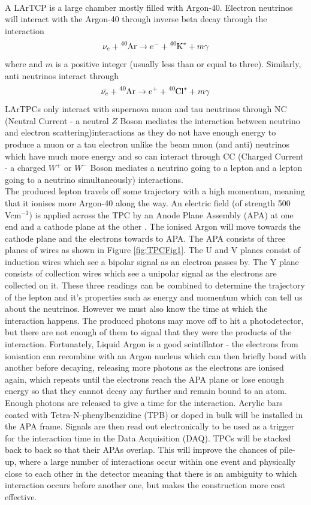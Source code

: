 \documentclass[a4paper,12,oneside,notitlepage]{report}
\begin{document}
\vspace{0.5cm}
\\A LArTCP is a large chamber mostly filled with Argon-40. Electron neutrinos will interact with the Argon-40 through inverse beta decay through the interaction
$$\nu_e + \ce{^{40}Ar} \rightarrow e^- +\ce{^{40}K^*} +m\gamma$$
where and $m$ is a positive integer (usually less than or equal to three). Similarly, anti neutrinos interact through
$$\bar{\nu_e}+\ce{^{40}Ar} \rightarrow e^+ + \ce{^{40}Cl^*}+m \gamma$$
LArTPCs only interact with supernova muon and tau neutrinos through NC (Neutral Current - a neutral $Z$ Boson mediates the interaction between neutrino and electron scattering)interactions as they do not have enough energy to produce a muon or a tau electron unlike the beam muon (and anti) neutrinos which have much more energy and so can interact through CC (Charged Current - a charged $W^+$ or $W^-$ Boson mediates a neutrino going to a lepton and a lepton going to a neutrino simultaneously) interactions.
\vspace{0.5cm}
\\The produced lepton travels off some trajectory with a high momentum, meaning that it ionises more Argon-40 along the way. An electric field (of strength 500 Vcm$^{-1}$) is applied across the TPC by an Anode Plane Assembly (APA) at one end and a cathode plane at the other \cite{LBNEVol4}. The ionised Argon will move towards the cathode plane and the electrons towards to APA. The APA consists of three planes of wires as shown in Figure \ref{fig:TPCFig1}. The U and V planes consist of induction wires which see a bipolar signal as an electron passes by. The Y plane consists of collection wires which see a unipolar signal as the electrons are collected on it. These three readings can be combined to determine the trajectory of the lepton and it's properties such as energy and momentum which can tell us about the neutrinos. However we must also know the time at which the interaction happens. The produced photons may move off to hit a photodetector, but there are not enough of them to signal that they were the products of the interaction. Fortunately, Liquid Argon is a good scintillator - the electrons from ionisation can recombine with an Argon nucleus which can then briefly bond with another before decaying, releasing more photons as the electrons are ionised again, which repeats until the electrons reach the APA plane or lose enough energy so that they cannot decay any further and remain bound to an atom. Enough photons are released to give a time for the interaction. Acrylic bars coated with Tetra-N-phenylbenzidine (TPB) or doped in bulk will be installed in the APA frame. Signals are then read out electronically to be used as a trigger for the interaction time in the Data Acquisition (DAQ). TPCs will be stacked back to back so that their APAs overlap. This will improve the chances of pile-up, where a large number of interactions occur within one event and physically close to each other in the detector meaning that there is an ambiguity to which interaction occurs before another one, but makes the construction more cost effective.
\end{document}
